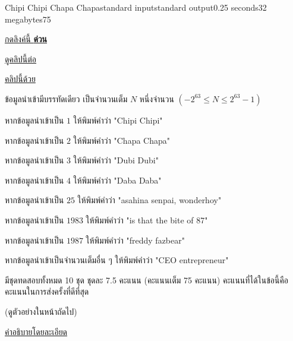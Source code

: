 \documentclass[11pt,a4paper]{article}
\begin{document}
\begin{problem}{Chipi Chipi Chapa Chapa}{standard input}{standard output}{0.25 seconds}{32 megabytes}{75}

\textcolor{blue}{\href{https://storage.leomotors.me/vtwi/chipichipi.mp4}{กดลิงค์นี้ \textbf{ด่วน}}}

\textcolor{blue}{\href{https://storage.leomotors.me/vtwi/kanamafu-chipichapi.mp4}{ดูคลิปนี้ต่อ}}

\textcolor{blue}{\href{https://storage.leomotors.me/vtwi/chipi-fazbear.mp4}{คลิปนี้ด้วย}}

\InputFile

ข้อมูลนำเข้ามีบรรทัดเดียว เป็นจำนวนเต็ม $N$ หนึ่งจำนวน $(-2^{63} \le N \le 2^{63} - 1)$

\OutputFile

หากข้อมูลนำเข้าเป็น $1$ ให้พิมพ์คำว่า "Chipi Chipi"

หากข้อมูลนำเข้าเป็น $2$ ให้พิมพ์คำว่า "Chapa Chapa"

หากข้อมูลนำเข้าเป็น $3$ ให้พิมพ์คำว่า "Dubi Dubi"

หากข้อมูลนำเข้าเป็น $4$ ให้พิมพ์คำว่า "Daba Daba"

หากข้อมูลนำเข้าเป็น $25$ ให้พิมพ์คำว่า "asahina senpai, wonderhoy"

หากข้อมูลนำเข้าเป็น $1983$ ให้พิมพ์คำว่า "is that the bite of 87"

หากข้อมูลนำเข้าเป็น $1987$ ให้พิมพ์คำว่า "freddy fazbear"

หากข้อมูลนำเข้าเป็นจำนวนเต็มอื่น ๆ ให้พิมพ์คำว่า "CEO entrepreneur"

\Scoring

มีชุดทดสอบทั้งหมด 10 ชุด ชุดละ 7.5 คะแนน (คะแนนเต็ม 75 คะแนน) คะแนนที่ได้ในข้อนี้คือคะแนนในการส่งครั้งที่ดีที่สุด

(ดูตัวอย่างในหน้าถัดไป)

\Examples

\begin{example}
%
%
%
%
%
%
%
%
%
\end{example}

\Note

\textcolor{blue}{\href{https://storage.leomotors.me/vtwi/wonderhoy.mp4}{คำอธิบายโดยละเอียด}}

\end{problem}
\end{document}
